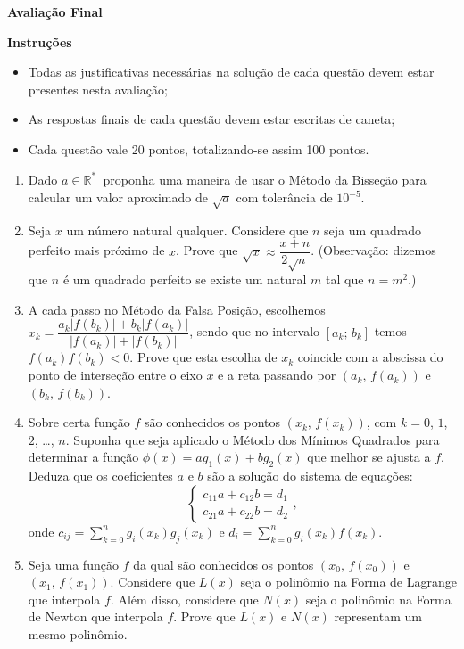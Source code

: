 \documentclass[11pt,a4paper]{article}
\begin{document}
\begin{center}
 \textbf{Avaliação Final}
\end{center}

\textbf{Instruções}
\begin{itemize}
 \item Todas as justificativas necessárias na solução de cada questão devem estar presentes nesta avaliação;
 \item As respostas finais de cada questão devem estar escritas de caneta;
 \item Cada questão vale 20 pontos, totalizando-se assim 100 pontos.
\end{itemize}

\begin{enumerate}
 
 \item Dado $a\in\mathbb{R}_+^*$ proponha uma maneira de usar o Método da Bisseção para calcular um valor aproximado de $\sqrt{a}$ com tolerância de $10^{-5}$.
 \item Seja $x$ um número natural qualquer. Considere que $n$ seja um quadrado perfeito mais próximo de $x$. Prove que $\sqrt{x}\approx \dfrac{x+n}{2\sqrt{n}}$. 
 (Observação: dizemos que $n$ é um quadrado perfeito se existe um natural $m$ tal que $n = m^2$.)
 \item A cada passo no Método da Falsa Posição, escolhemos $x_k = \dfrac{a_k|f(b_k)| + b_k|f(a_k)|}{|f(a_k)|+|f(b_k)|}$, sendo que no intervalo $[a_k;\,b_k]$ temos $f(a_k)f(b_k)<0$. Prove que 
 esta escolha de $x_k$ coincide com a abscissa do ponto de interseção entre o eixo $x$ e a reta passando por $(a_k,\,f(a_k))$ e $(b_k,\,f(b_k))$.
  
 \item Sobre certa função $f$ são conhecidos os pontos $(x_k,\,f(x_k))$, com $k=0$, $1$, $2$, \ldots, $n$. Suponha que seja 
aplicado o Método dos Mínimos Quadrados para determinar a função $\phi(x) = ag_1(x) + bg_2(x)$ que melhor se ajusta a $f$. Deduza que os coeficientes $a$ e 
$b$ são a solução do sistema de equações:
$$\begin{cases}
   c_{11}a + c_{12}b = d_1 \\
   c_{21}a + c_{22}b = d_2
  \end{cases},
$$
onde $\displaystyle c_{ij} = \sum_{k=0}^n g_i(x_k)g_j(x_k)$ e $\displaystyle d_{i} = \sum_{k=0}^n g_i(x_k)f(x_k)$.

 \item Seja uma função $f$ da qual são conhecidos os pontos $(x_0,\,f(x_0))$ e $(x_1,\,f(x_1))$. Considere que 
$L(x)$ seja o polinômio na Forma de Lagrange que interpola $f$. Além disso, considere que $N(x)$ seja o polinômio na Forma de Newton que 
interpola $f$. Prove que $L(x)$ e $N(x)$ representam um mesmo polinômio. 

\end{enumerate}
\end{document}
